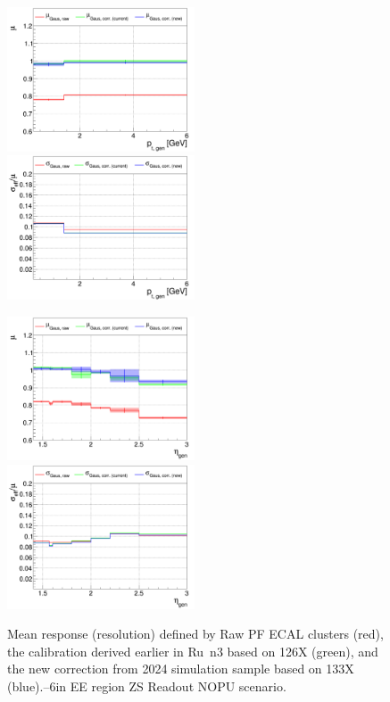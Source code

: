 \begin{figure}
\includegraphics[width=0.495\textwidth]{./plots_pdf/ECAL_plots/plotsNoPU/EE/pdf/ZS/GENPT/EEZS_GENPT_0000_0006_MuOverBins.pdf}
\includegraphics[width=0.495\textwidth]{./plots_pdf/ECAL_plots/plotsNoPU/EE/pdf/ZS/GENPT/EEZS_GENPT_0000_0006_EffSigmaOverBins.pdf}

\includegraphics[width=0.495\textwidth]{./plots_pdf/ECAL_plots/plotsNoPU/EE/pdf/ZS/GENETA/EEZS_GENETA_0000_0006_MuOverBins.pdf}
\includegraphics[width=0.495\textwidth]{./plots_pdf/ECAL_plots/plotsNoPU/EE/pdf/ZS/GENETA/EEZS_GENETA_0000_0006_EffSigmaOverBins.pdf}
\caption[$\mu$ ($\sigma_\mathrm{eff}$) vs \pt of PF ECAL cluster - EE ZS readout NoPU scenario]{Mean response (resolution) defined by Raw PF ECAL clusters (red), the calibration derived earlier in Ru\
n3 based on 126X (green), and the new correction from 2024 simulation sample based on 133X (blue).--6\GeV in EE region ZS Readout NOPU scenario.}
\end{figure}

